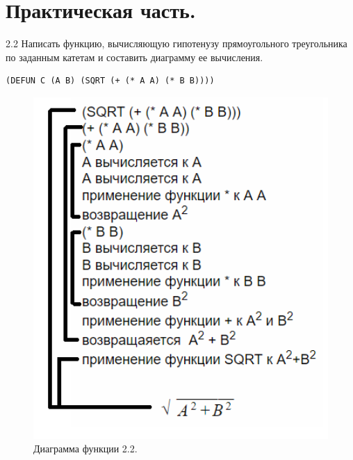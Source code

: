 \section{Практическая часть.}

2.2 Написать функцию, вычисляющую гипотенузу прямоугольного треугольника по заданным катетам и составить диаграмму ее вычисления.

\begin{lstlisting}
(DEFUN C (A B) (SQRT (+ (* A A) (* B B))))
\end{lstlisting}

\begin{figure}[ht!]
 	\includegraphics[width=1.1\textwidth]{1.PNG}
 	\caption{Диаграмма функции 2.2.}
 \end{figure}

